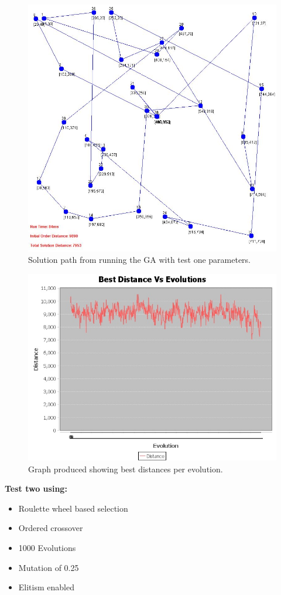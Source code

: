\documentclass[article]{IEEEtran}
\begin{document}
\begin{figure}[H]
\centering
\includegraphics[width=.8\linewidth]{images/test1}
\caption{Solution path from running the GA with test one parameters.}
\label{fig:14}
\end{figure}

\begin{figure}[H]
\centering
\includegraphics[width=.8\linewidth]{images/bestDistances1}
\caption{Graph produced showing best distances per evolution.}
\label{fig:15}
\end{figure}

\textbf{Test two using:} 
\begin{itemize}
\item Roulette wheel based selection
\item Ordered crossover
\item 1000 Evolutions
\item Mutation of 0.25
\item Elitism enabled
\end{itemize} 
\end{document}
